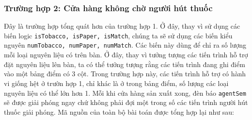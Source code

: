 \subsubsection{Trường hợp 2: Cửa hàng không chờ người hút thuốc}
Đây là trường hợp tổng quát hơn của trường hợp 1. Ở đây, thay vì sử dụng các biến logic {\tt isTobacco, isPaper, isMatch}, chúng ta sẽ sử dụng các biến kiểu nguyên {\tt numTobacco, numPaper, numMatch}. Các biến này dùng để chỉ ra số lượng mỗi loại nguyên liệu có trên bàn. Ở đây, thay vì tưởng tượng các tiến trình hỗ trợ đặt nguyên liệu lên bàn, ta có thể tưởng tượng rằng các tiến trình đang ghi điểm vào một bảng điểm có 3 cột. Trong trường hợp này, các tiến trình hỗ trợ có hành vi giống hệt ở trườn hợp 1, chỉ khác là ở trong bảng điểm, số lượng các loại nguyên liệu có thể lớn hơn 1. Mỗi khi cửa hàng sản xuất xong, đèn báo {\tt agentSem} sẽ được giải phóng ngay chứ không phải đợi một trong số các tiến trình người hút thuốc giải phóng. Mã nguồn của toàn bộ bài toán được tổng hợp lại như sau:\\[7pt]
